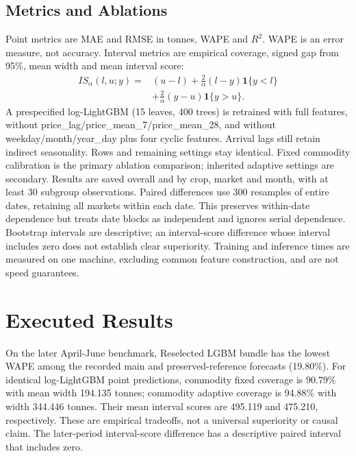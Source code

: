 \documentclass[conference]{IEEEtran}
\begin{document}
\subsection{Metrics and Ablations}
Point metrics are MAE and RMSE in tonnes, WAPE and $R^2$. WAPE is an error measure, not accuracy. Interval metrics are empirical coverage, signed gap from 95\%, mean width and mean interval score:
\begin{align}IS_\alpha(l,u;y)={}&(u-l)+\frac{2}{\alpha}(l-y)\mathbf1\{y<l\}\nonumber\\&+\frac{2}{\alpha}(y-u)\mathbf1\{y>u\}.\end{align}
A prespecified log-LightGBM (15 leaves, 400 trees) is retrained with full features, without price\_lag/price\_mean\_7/price\_mean\_28, and without weekday/month/year\_day plus four cyclic features. Arrival lags still retain indirect seasonality. Rows and remaining settings stay identical. Fixed commodity calibration is the primary ablation comparison; inherited adaptive settings are secondary. Results are saved overall and by crop, market and month, with at least 30 subgroup observations.
Paired differences use 300 resamples of entire dates, retaining all markets within each date. This preserves within-date dependence but treats date blocks as independent and ignores serial dependence. Bootstrap intervals are descriptive; an interval-score difference whose interval includes zero does not establish clear superiority. Training and inference times are measured on one machine, excluding common feature construction, and are not speed guarantees.
\section{Executed Results}
On the later April-June benchmark, Reselected LGBM bundle has the lowest WAPE among the recorded main and preserved-reference forecasts (19.80\%). For identical log-LightGBM point predictions, commodity fixed coverage is 90.79\% with mean width 194.135 tonnes; commodity adaptive coverage is 94.88\% with width 344.446 tonnes. Their mean interval scores are 495.119 and 475.210, respectively. These are empirical tradeoffs, not a universal superiority or causal claim. The later-period interval-score difference has a descriptive paired interval that includes zero.
\end{document}
